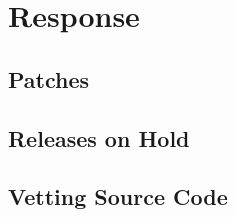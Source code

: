 \section{Response}

\subsection{Patches}
\subsection{Releases on Hold}
\subsection{Vetting Source Code}
